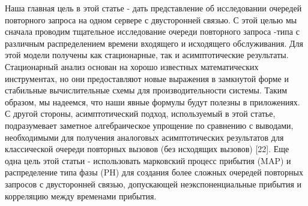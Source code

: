 Наша главная цель в этой статье - дать представление об исследовании очередей повторного запроса на одном сервере с двусторонней связью. С этой целью мы сначала проводим тщательное исследование очереди повторного запроса -типа с различным распределением времени входящего и исходящего обслуживания. Для этой модели получены как стационарные, так и асимптотические результаты. Стационарный анализ основан на хорошо известных математических инструментах, но они предоставляют новые выражения в замкнутой форме и стабильные вычислительные схемы для производительности системы. Таким образом, мы надеемся, что наши явные формулы будут полезны в приложениях. С другой стороны, асимптотический подход, используемый в этой статье, подразумевает заметное алгебраическое упрощение по сравнению с выводами, необходимыми для получения аналоговых асимптотических результатов для классической очереди повторных вызовов (без исходящих вызовов) [22]. Еще одна цель этой статьи - использовать марковский процесс прибытия (MAP) и распределение типа фазы (PH) для создания более сложных очередей повторных запросов с двусторонней связью, допускающей неэкспоненциальные прибытия и корреляцию между временами прибытия.





